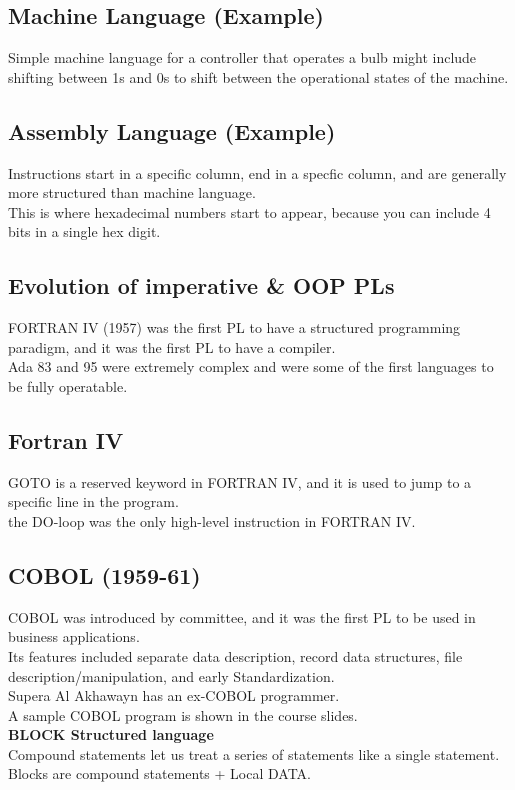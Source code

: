     \subsection{Machine Language (Example)}
    Simple machine language for a controller that operates a bulb might include shifting between 1s and 0s to shift between the operational states of the machine.\\
    \subsection{Assembly Language (Example)}
    Instructions start in a specific column, end in a specfic column, and are generally more structured than machine language.\\ This is where hexadecimal numbers start to appear, because you can include 4 bits in a single hex digit.\\
    \subsection{Evolution of imperative \& OOP PLs}
    FORTRAN IV (1957) was the first PL to have a structured programming paradigm, and it was the first PL to have a compiler.\\
    Ada 83 and 95 were extremely complex and were some of the first languages to be fully operatable.\\
    \subsection{Fortran IV}
    GOTO is a reserved keyword in FORTRAN IV, and it is used to jump to a specific line in the program.\\
    the DO-loop was the only high-level instruction in FORTRAN IV.\\
    \subsection{COBOL (1959-61)}
    COBOL was introduced by committee, and it was the first PL to be used in business applications.\\
    Its features included separate data description, record data structures, file description/manipulation, and early Standardization.\\
    Supera Al Akhawayn has an ex-COBOL programmer.\\
    A sample COBOL program is shown in the course slides.\\
    \textbf{BLOCK Structured language}\\
    Compound statements let us treat a series of statements like a single statement.\\
    Blocks are compound statements + Local DATA.\\
